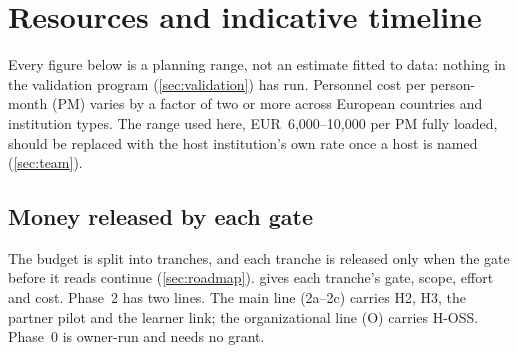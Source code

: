 \section{Resources and indicative timeline}
\label{sec:resources}

\begin{evfutbox}
  Every figure below is a planning range, not an estimate fitted to data: nothing in the
  validation program (\cref{sec:validation}) has run. Personnel cost per person-month (PM) varies
  by a factor of two or more across European countries and institution types. The range used
  here, EUR~6{,}000--10{,}000 per PM fully loaded, should be replaced with the host institution's
  own rate once a host is named (\cref{sec:team}).
\end{evfutbox}

\subsection{Money released by each gate}

The budget is split into tranches, and each tranche is released only when the gate before it
reads continue (\cref{sec:roadmap}).  gives each tranche's gate, scope,
effort and cost. Phase~2 has two lines. The main line (2a--2c) carries H2, H3, the partner
pilot and the learner link; the organizational line (O) carries H-OSS. Phase~0 is owner-run and
needs no grant.


